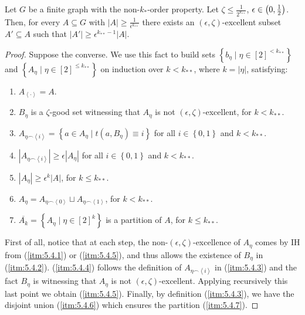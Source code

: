     \lemma[Claim 5.4]\label{existance_of_excellent_subsets}
        Let $G$ be a finite graph with the non-$k_{*}$-order property.
        Let $\zeta \leq \frac{1}{2^{k_{**}}}$, $\epsilon \in \left( 0, \frac{1}{2} \right)$.
        Then, for every $A \subseteq G$ with $|A| \geq \frac{1}{\epsilon^{k_{**}}}$ there exists an $(\epsilon, \zeta)$-excellent
        subset $A' \subseteq A$ such that $|A'| \geq \epsilon^{k_{**}-1} |A|$.
        \begin{proof}
            Suppose the converse.
            We use this fact to build sets $\left\{ b_\eta \mid \eta \in [2]^{<k_{**}} \right\}$ and
            $\left\{ A_\eta \mid \eta \in [2]^{\leq k_{**}} \right\}$ on induction over $k<k_{**}$, where $k = |\eta|$,
            satisfying:
            \begin{enumerate}
                \item\label{itm:5.4.1} $A_{\left< \cdot \right>} = A$.
                \item\label{itm:5.4.2} $B_\eta$ is a $\zeta$-good set witnessing that $A_\eta$ is not
                    $(\epsilon, \zeta)$-excellent, for $k < k_{**}$.
                \item\label{itm:5.4.3} $A_{\eta \frown \left< i \right>} = \left\{ a \in A_\eta \mid t(a, B_\eta) \equiv i \right\}$
                    for all $i \in \left\{ 0,1 \right\}$ and $k < k_{**}$.
                \item\label{itm:5.4.4} $|A_{\eta \frown \left< i \right>}| \geq \epsilon |A_\eta|$
                    for all $i \in \left\{ 0,1 \right\}$ and $k < k_{**}$.
                \item\label{itm:5.4.5} $|A_\eta| \geq \epsilon^k |A|$, for $k \leq k_{**}$.
                \item\label{itm:5.4.6} $A_\eta = A_{\eta \frown \left< 0 \right>} \sqcup A_{\eta \frown \left< 1 \right>}$,
                    for $k < k_{**}$.
                \item\label{itm:5.4.7} $\overline{A_k} = \left\{ A_\eta \mid \eta \in [2]^k \right\}$ is a partition of $A$,
                    for $k \leq k_{**}$.
            \end{enumerate}
            First of all, notice that at each step, the non-$(\epsilon, \zeta)$-excellence of $A_\eta$ comes by IH
            from (\ref{itm:5.4.1}) or (\ref{itm:5.4.5}), and thus allows the existence of $B_\eta$ in (\ref{itm:5.4.2}).
            (\ref{itm:5.4.4}) follows the definition of $A_{\eta \frown \left< i \right>}$ in (\ref{itm:5.4.3}) and
            the fact $B_\eta$ is witnessing that $A_\eta$ is not $(\epsilon, \zeta)$-excellent.
            Applying recursively this last point we obtain (\ref{itm:5.4.5}).
            Finally, by definition (\ref{itm:5.4.3}), we have the disjoint union (\ref{itm:5.4.6}) which ensures
            the partition (\ref{itm:5.4.7}).


\end{proof}

